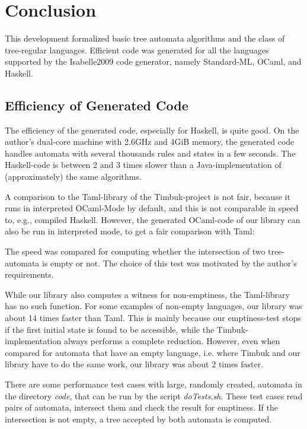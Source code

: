 \section{Conclusion}\label{sec:conclusion}
This development formalized basic tree automata algorithms and the class of tree-regular languages.
Efficient code was generated for all the languages supported by the Isabelle2009 code generator, namely Standard-ML, OCaml, and Haskell.

\subsection{Efficiency of Generated Code}\label{sec:efficiency}
  The efficiency of the generated code, especially for Haskell, is quite good. On the author's dual-core machine with 2.6GHz and 4GiB memory, the generated code handles automata with several thousands rules and states in a few seconds. The Haskell-code is between 2 and 3 times slower than a 
  Java-implementation of (approximately) the same algorithms. 

  A comparison to the Taml-library of the Timbuk-project \cite{TIMBUK} is not fair, because it runs in interpreted OCaml-Mode by default, and this is not comparable in speed to, e.g., compiled Haskell. However, the generated OCaml-code of our library can also be run in interpreted mode, to get a fair comparison with Taml:

  The speed was compared for computing whether the intersection of two tree-automata is empty or not. The choice of this test was motivated by the author's requirements.

  While our library also computes a witness for non-emptiness, the
  Taml-library has no such function. For some examples of non-empty languages, our library was about 14 times faster than Taml. This is mainly because our 
  emptiness-test stops if the first initial state is found to be accessible, while the Timbuk-implementation always performs a complete reduction.
  However, even when compared for automata that have an empty language, i.e. where Timbuk and our library have to do the same work, our library was about 2 
  times faster.

  There are some performance test cases with large, randomly created, automata in the directory {\em code}, that can be run by the script {\em doTests.sh}. These test cases read pairs of automata, intersect them and check the result for emptiness. If the intersection is not empty, a tree accepted by both automata is computed.


